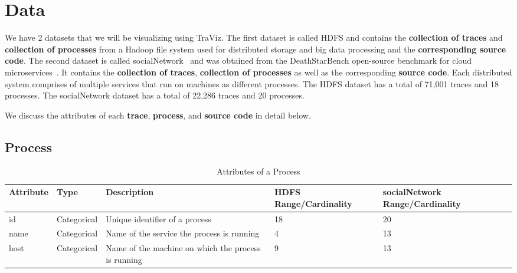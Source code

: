 \section{Data}

We have 2 datasets that we will be visualizing using TraViz.
The first dataset is called HDFS and contains the \textbf{collection of traces} and \textbf{collection of processes}
from a Hadoop file system used for distributed storage 
and big data processing and the \textbf{corresponding source code}.
The second dataset is called socialNetwork~\cite{anand2019deathstarbenchtraces} and was obtained from the DeathStarBench open-source benchmark for cloud microservices~\cite{gan2019open}.
It contains the \textbf{collection of traces}, \textbf{collection of processes} as well as the corresponding \textbf{source code}.
Each distributed system comprises of multiple services that run on machines as different processes.
The HDFS dataset has a total of 71,001 traces and 18 processes.
The socialNetwork dataset has a total of 22,286 traces and 20 processes.

We discuss the attributes of each \textbf{trace}, \textbf{process}, and \textbf{source code} in detail below.

\subsection{Process}

\begin{table*}[]
  \centering
  \begin{adjustbox}{width=1\textwidth}
  \begin{tabular}{|l|l|l|l|l|}
  \hline
  Attribute & Type        & Description                                & HDFS Range/Cardinality & socialNetwork Range/Cardinality \\ \hline
  id        & Categorical & Unique identifier of a process             & 18                     & 20                              \\ \hline
  name      & Categorical & Name of the service the process is running & 4                      & 13                              \\ \hline
  host      & Categorical & Name of the machine on which the process is running & 9 & 13 \\ \hline
  \end{tabular}
\end{adjustbox}

\label{tab:process}
\caption{Attributes of a Process}
\end{table*}

